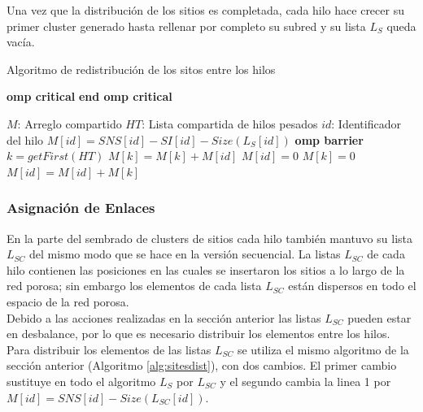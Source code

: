Una vez que la distribución de los sitios es completada, cada hilo hace crecer su primer cluster generado hasta rellenar por 
completo su subred y su lista $L_S$ queda vacía.
 
\begin{algorithm}
\caption{Algoritmo de redistribución de los sitos entre los hilos}\label{alg:sitesdist}
\begin{algorithmic}[1]
    {\textbf{omp critical}}
    {\textbf{end omp critical}}
    
\Require $M$: Arreglo compartido
\Require $HT$: Lista compartida de hilos pesados
\Require $id$: Identificador del hilo
\State $M[id]=SNS[id]-SI[id]-Size(L_S[id])$
	\ompcritical
		\State {}
	\eompcritical
\EndIf
\State \textbf{omp barrier}
	\ompcritical
			\State $k=getFirst(HT)$
				\State {}
				\State $M[k]=M[k]+M[id]$
				\State $M[id]=0$
			\Else
				\State {}
				\State $M[k]=0$
				\State $M[id]=M[id]+M[k]$
				\State {}	
			\EndIf
		\EndWhile
	\eompcritical
\EndIf
\end{algorithmic}
\end{algorithm}

\subsubsection{Asignación de Enlaces}
\label{subsec:pbond}
En la parte del sembrado de clusters de sitios cada hilo también mantuvo su lista $L_{SC}$ del mismo modo que se hace en la versión secuencial.
La listas $L_{SC}$ de cada hilo contienen las posiciones en las cuales se insertaron los sitios a lo largo de la red porosa; sin embargo 
los elementos de cada lista $L_{SC}$ están dispersos en todo el espacio de la red porosa.\\

Debido a las acciones realizadas en la sección anterior las listas $L_{SC}$ pueden estar en desbalance, por lo que es necesario 
distribuir los elementos entre los hilos. Para distribuir los elementos de las listas $L_{SC}$ se utiliza el mismo algoritmo de 
la sección anterior (Algoritmo \ref{alg:sitesdist}), con dos cambios. El primer cambio sustituye en todo el algoritmo $L_S$ por 
$L_{SC}$ y el segundo cambia la linea 1 por $M[id]=SNS[id]-Size(L_{SC}[id])$.\\

